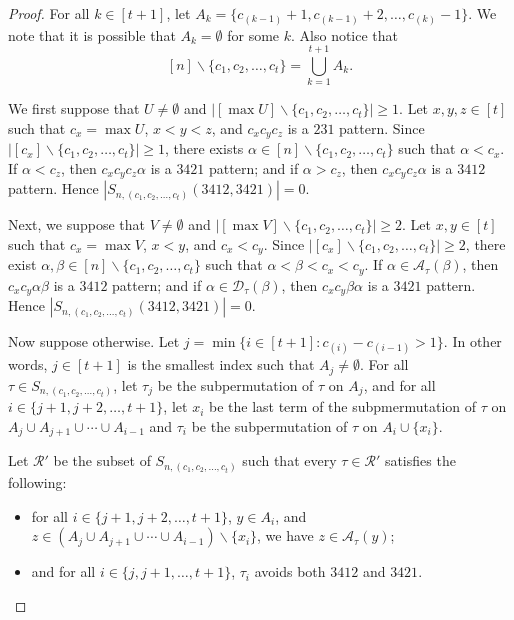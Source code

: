\documentclass[11pt]{article}
\theoremstyle{definition}
\numberwithin{equation}{section}
\begin{document}
\begin{proof}
    For all $k\in[t+1]$, let $A_k=\{c_{(k-1)}+1,c_{(k-1)}+2,\ldots,c_{(k)}-1\}$. We note that it is possible that $A_k=\emptyset$ for some $k$. Also notice that
    \[
[n]\backslash\{c_1,c_2,\ldots,c_t\}=\bigcup_{k=1}^{t+1}A_k.
\]


We first suppose that $U\neq\emptyset$ and $\left|[\max U]\backslash\{c_1,c_2,\ldots,c_t\}\right|\geq1$. Let $x,y,z\in[t]$ such that $c_x=\max U$, $x<y<z$, and $c_xc_yc_z$ is a $231$ pattern. Since $\left|[c_x]\backslash\{c_1,c_2,\ldots,c_t\}\right|\geq1$, there exists $\alpha\in [n]\backslash\{c_1,c_2,\ldots,c_t\}$ such that $\alpha<c_x$. If $\alpha<c_z$, then $c_xc_yc_z\alpha$ is a $3421$ pattern; and if $\alpha>c_z$, then $c_xc_yc_z\alpha$ is a $3412$ pattern. Hence $|S_{n,(c_1,c_2,\ldots,c_t)}(3412,3421)|=0$.

Next, we suppose that $V\neq\emptyset$ and $\left|[\max V]\backslash\{c_1,c_2,\ldots,c_t\}\right|\geq2$. Let $x,y\in[t]$ such that $c_x=\max V$, $x<y$, and $c_x<c_y$. Since $\left|[c_x]\backslash\{c_1,c_2,\ldots,c_t\}\right|\geq2$, there exist $\alpha,\beta\in[n]\backslash\{c_1,c_2,\ldots,c_t\}$ such that $\alpha<\beta<c_x<c_y$. If $\alpha\in\mathcal{A}_\tau(\beta)$, then $c_xc_y\alpha\beta$ is a $3412$ pattern; and if $\alpha\in\mathcal{D}_\tau(\beta)$, then $c_xc_y\beta\alpha$ is a $3421$ pattern. Hence $|S_{n,(c_1,c_2,\ldots,c_t)}(3412,3421)|=0$.

Now suppose otherwise. Let $j=\min\{i\in[t+1]:c_{(i)}-c_{(i-1)}>1\}$. In other words, $j\in[t+1]$ is the smallest index such that $A_j\neq\emptyset$. For all $\tau\in S_{n,(c_1,c_2,\ldots,c_t)}$, let $\tau_j$ be the subpermutation of $\tau$ on $A_j$, and for all $i\in\{j+1,j+2,\ldots,t+1\}$, let $x_i$ be the last term of the subpmermutation of $\tau$ on $A_j\cup A_{j+1}\cup\cdots \cup A_{i-1}$ and $\tau_i$ be the subpermutation of $\tau$ on $A_i\cup\{x_i\}$.
    
    Let $\mathcal{R}'$ be the subset of $S_{n,(c_1,c_2,\ldots,c_t)}$ such that every $\tau\in\mathcal{R}'$ satisfies the following:
    \begin{itemize}
        \item[(i)] for all $i\in\{j+1,j+2,\ldots,t+1\}$, $y\in A_i$, and $z\in (A_j\cup A_{j+1}\cup\cdots \cup A_{i-1})\backslash\{x_i\}$, we have $z\in\mathcal{A}_\tau(y)$;
        \item[(ii)] and for all $i\in\{j,j+1,\ldots,t+1\}$, $\tau_i$ avoids both $3412$ and $3421$.
    \end{itemize}
    

\end{proof}
\end{document}
